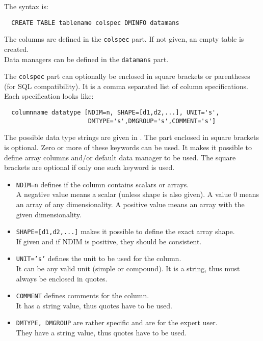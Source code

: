 The syntax is:
\begin{verbatim}
  CREATE TABLE tablename colspec DMINFO datamans
\end{verbatim}
The columns are defined in the \texttt{colspec} part. If not given, an
empty table is created.
\\Data managers can be defined in the \texttt{datamans} part.

The \texttt{colspec} part can optionally be enclosed in square
brackets or parentheses (for SQL compatibility).
It is a comma separated list of column specifications.
Each specification looks like:
\begin{verbatim}
  columnname datatype [NDIM=n, SHAPE=[d1,d2,...], UNIT='s',
                       DMTYPE='s',DMGROUP='s',COMMENT='s']
\end{verbatim}
The possible data type strings are given in
.
The part enclosed in square brackets is optional. Zero or more of
these keywords can be used. It makes it possible
to define array columns and/or default data manager to be used.
The square brackets are optional if only one such keyword is used.
\begin{itemize}
\item \texttt{NDIM=n} defines if the column contains scalars or arrays.
\\A negative value means a scalar (unless shape is also given).
A value 0 means an array of any dimensionality. A positive value means
an array with the given dimensionality.
\item \texttt{SHAPE=[d1,d2,...]} makes it possible to define the exact
array shape.
\\If given and if NDIM is positive, they should be consistent.
\item \texttt{UNIT='s'} defines the unit to be used for the column.
\\It can be any valid unit (simple or compound). It is a string,
thus must always be enclosed in quotes. 
\item \texttt{COMMENT} defines comments for the column.
\\It has a string value, thus quotes
have to be used.
\item \texttt{DMTYPE, DMGROUP} are rather specific and are for the expert user.
\\They have a string value, thus quotes
have to be used.
\end{itemize}

